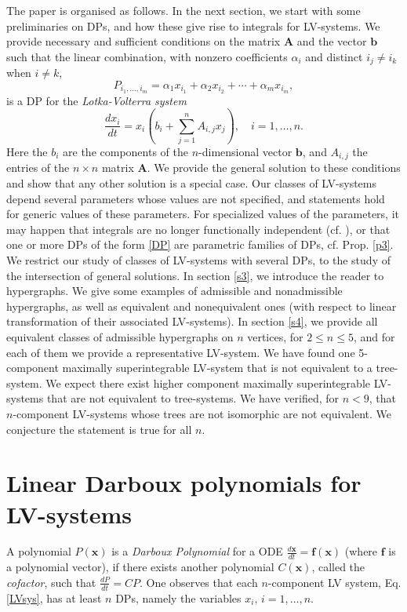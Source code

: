 \documentclass{article}
\def\A{\mathbf{A}}
\def\x{{\mathbf x}}
\def\f{{\mathbf f}}
\def\b{{\mathbf b}}
\begin{document}
The paper is organised as follows. In the next section, we start with some preliminaries on DPs, and how these give rise to integrals for LV-systems. We provide necessary and sufficient  conditions on the matrix $\A$ and the vector $\b$ such that the linear combination, with nonzero coefficients $\alpha_i$ and distinct $i_j\neq i_k$ when $i\neq k$,
\begin{equation} \label{DP}
P_{i_1,\ldots,i_m} = \alpha_1 x_{i_1} + \alpha_2 x_{i_2} + \cdots + \alpha_m x_{i_m},
\end{equation}
is a DP for the {\em Lotka-Volterra system}
\begin{equation} \label{LVsys}
\frac{dx_i}{dt} = x_i\left(b_i + \sum_{j=1}^{n}A_{i,j}x_j\right),\quad i=1,\dots,n.
\end{equation}
Here the $b_i$ are the components of the $n$-dimensional vector $\b$, and $A_{i,j}$ the entries of the $n\times n$ matrix $\A$. We provide the general solution to these conditions and show that any other solution is a special case. Our classes of LV-systems depend several parameters whose values are not specified, and statements hold for generic values of these parameters. For specialized values of the parameters, it may happen that integrals are no longer functionally independent (cf. \cite[Theorem 26]{trees}), or that one or more DPs of the form \eqref{DP} are parametric families of DPs, cf. Prop. \ref{p3}. We restrict our study of classes of LV-systems with several DPs, to the study of the intersection of general solutions. In section \ref{s3}, we introduce the reader to hypergraphs. We give some examples of admissible and nonadmissible hypergraphs, as well as equivalent and nonequivalent ones (with respect to linear transformation of their associated LV-systems). In section \ref{s4}, we provide all equivalent classes of admissible hypergraphs on $n$ vertices, for $2\leq n\leq 5$, and for each of them we provide a representative LV-system. We have found one 5-component maximally superintegrable LV-system that is not equivalent to a tree-system. We expect there exist higher component maximally superintegrable LV-systems that are not equivalent to tree-systems. We have verified, for $n<9$, that $n$-component LV-systems whose trees are not isomorphic are not equivalent. We conjecture the statement is true for all $n$. 

\section{Linear Darboux polynomials for LV-systems} \label{s2}
A polynomial $P(\x)$ is a {\em Darboux Polynomial} for a ODE $\frac{d\x}{dt}=\f(\x)$ (where $\f$ is a polynomial vector), if there exists another polynomial $C(\x)$, called the {\em cofactor}, such that $\frac{dP}{dt} = CP$. One observes that each $n$-component LV system, Eq. \eqref{LVsys}, has at least $n$ DPs, namely the variables $x_i, \, i=1,\dots,n$.
\end{document}
